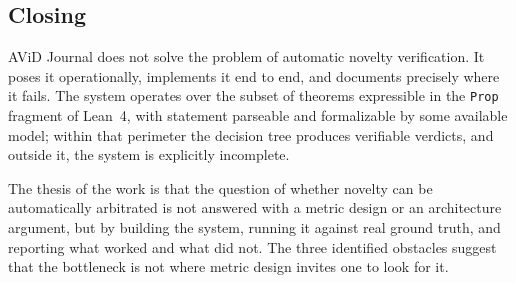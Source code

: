 \documentclass{article}
\theoremstyle{remark}
\begin{document}
\subsection{Closing}

AViD Journal does not solve the problem of automatic novelty verification. It poses it operationally, implements it end to end, and documents precisely where it fails. The system operates over the subset of theorems expressible in the \texttt{Prop} fragment of Lean~4, with statement parseable and formalizable by some available model; within that perimeter the decision tree produces verifiable verdicts, and outside it, the system is explicitly incomplete.

The thesis of the work is that the question of whether novelty can be automatically arbitrated is not answered with a metric design or an architecture argument, but by building the system, running it against real ground truth, and reporting what worked and what did not. The three identified obstacles suggest that the bottleneck is not where metric design invites one to look for it.
\end{document}
